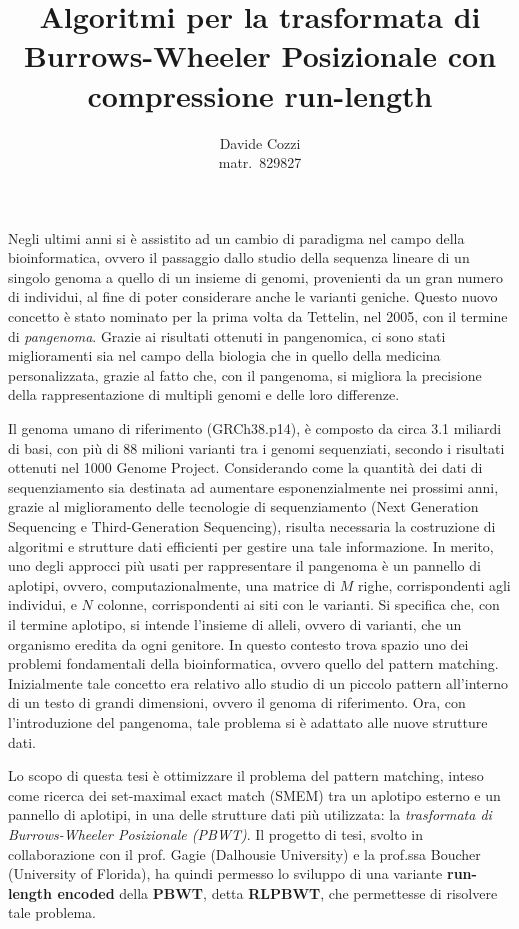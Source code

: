 \documentclass[a4paper,11pt, oneside,italian]{article}
\title{Algoritmi per la trasformata di Burrows-Wheeler
  Posizionale con compressione run-length}
\author{Davide Cozzi\\\smaller matr.~829827}
\date{}
\begin{document}
\maketitle
{}
\noindent
Negli ultimi anni si è assistito ad un cambio di paradigma nel campo della
bioinformatica, ovvero il passaggio dallo studio della sequenza lineare di un
singolo genoma a quello di un insieme di genomi, provenienti da un gran numero
di individui, al fine di poter considerare anche le varianti
  geniche. Questo nuovo concetto è stato nominato per la prima volta da
Tettelin, nel 2005, con il termine di \textit{pangenoma}. Grazie ai risultati
ottenuti in pangenomica, ci sono stati miglioramenti sia nel 
campo della biologia che in quello della medicina personalizzata, grazie al
fatto che, con il pangenoma, si migliora la precisione della rappresentazione di
multipli genomi e delle loro differenze. 

Il genoma umano di riferimento (GRCh38.p14), è composto da circa
3.1 miliardi di basi, con più di 88 milioni 
varianti tra i genomi sequenziati, secondo i risultati ottenuti nel 1000 Genome
Project. Considerando come la quantità dei dati di sequenziamento sia destinata
ad aumentare esponenzialmente nei prossimi anni, grazie al
miglioramento delle tecnologie di sequenziamento (Next Generation Sequencing e
Third-Generation Sequencing), risulta necessaria la costruzione di algoritmi e
strutture dati efficienti per gestire una tale informazione. 
In merito, uno degli approcci più usati per rappresentare il pangenoma è un
pannello di aplotipi, ovvero, computazionalmente, una matrice di $M$
righe, corrispondenti agli individui, e $N$ colonne, corrispondenti ai siti con
le varianti. Si specifica che, con il termine
aplotipo, si intende l'insieme di alleli, ovvero di varianti, che un organismo
eredita da ogni genitore.
In questo contesto trova spazio uno dei problemi fondamentali della
bioinformatica, ovvero quello del pattern matching. Inizialmente tale concetto
  era relativo allo studio di un piccolo pattern all'interno di un testo di
  grandi dimensioni, ovvero il genoma di riferimento. Ora, con l'introduzione 
del pangenoma, tale problema si è adattato alle nuove strutture
dati.

Lo scopo di questa tesi è ottimizzare il problema del pattern 
matching, inteso come ricerca dei set-maximal exact match (SMEM) tra un aplotipo
esterno e un pannello di aplotipi, in una delle 
strutture dati più utilizzata: la \textit{trasformata di Burrows-Wheeler
  Posizionale (PBWT)}. Il progetto di tesi, svolto in collaborazione con il
prof. Gagie (Dalhousie University) e la prof.ssa Boucher 
(University of Florida), ha quindi permesso lo sviluppo di una variante
\textbf{run-length encoded} della \textbf{PBWT}, detta \textbf{RLPBWT}, che
permettesse di risolvere tale problema.
\end{document}
